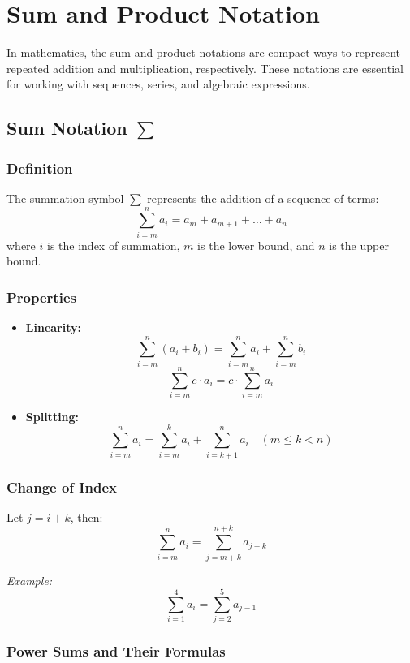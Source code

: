 \section{Sum and Product Notation}

In mathematics, the sum and product notations are compact ways to represent repeated addition and multiplication, respectively. These notations are essential for working with sequences, series, and algebraic expressions.

\subsection{Sum Notation \texorpdfstring{$\sum$}{∑}}

\subsubsection*{Definition}

The summation symbol $\sum$ represents the addition of a sequence of terms:
\[
\sum_{i = m}^{n} a_i = a_m + a_{m+1} + \dots + a_n
\]
where $i$ is the index of summation, $m$ is the lower bound, and $n$ is the upper bound.

\subsubsection*{Properties}

\begin{itemize}[label=$-$]
    \item \textbf{Linearity:}
    \[
    \sum_{i = m}^{n} (a_i + b_i) = \sum_{i = m}^{n} a_i + \sum_{i = m}^{n} b_i
    \]
    \[
    \sum_{i = m}^{n} c \cdot a_i = c \cdot \sum_{i = m}^{n} a_i
    \]
    \item \textbf{Splitting:}
    \[
    \sum_{i = m}^{n} a_i = \sum_{i = m}^{k} a_i + \sum_{i = k+1}^{n} a_i \quad (m \le k < n)
    \]
\end{itemize}

\subsubsection*{Change of Index}

Let $j = i + k$, then:
\[
\sum_{i = m}^{n} a_i = \sum_{j = m + k}^{n + k} a_{j - k}
\]

\textit{Example:}
\[
\sum_{i = 1}^{4} a_i = \sum_{j = 2}^{5} a_{j - 1}
\]

\subsubsection*{Power Sums and Their Formulas}

